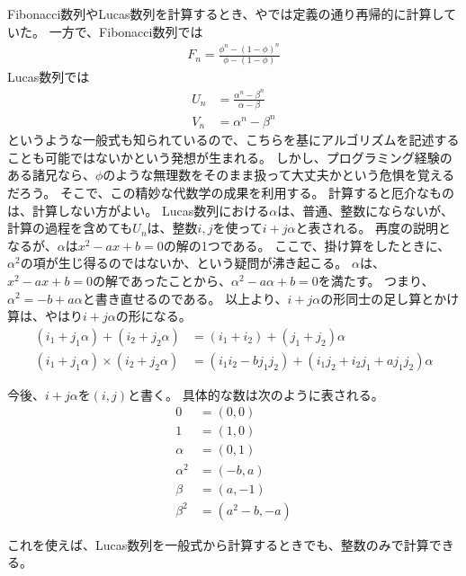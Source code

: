 Fibonacci数列やLucas数列を計算するとき、やでは定義の通り再帰的に計算していた。
一方で、Fibonacci数列では
\begin{align*}
F_n = \frac{\phi^n - (1 - \phi)^n}{\phi - (1 - \phi)}
\end{align*}
Lucas数列では
\begin{align*}
U_n &= \frac{\alpha^n - \beta^n}{\alpha - \beta}\\
V_n &= \alpha^n - \beta^n
\end{align*}
というような一般式も知られているので、こちらを基にアルゴリズムを記述することも可能ではないかという発想が生まれる。
しかし、プログラミング経験のある諸兄なら、$\phi$のような無理数をそのまま扱って大丈夫かという危惧を覚えるだろう。
そこで、この精妙な代数学の成果を利用する。
計算すると厄介なものは、計算しない方がよい。
Lucas数列における$\alpha$は、普通、整数にならないが、計算の過程を含めても$U_n$は、整数$i,j$を使って$i + j\alpha$と表される。
再度の説明となるが、$\alpha$は$x^2-ax+b=0$の解の1つである。
ここで、掛け算をしたときに、$\alpha^2$の項が生じ得るのではないか、という疑問が沸き起こる。
$\alpha$は、$x^2-ax+b=0$の解であったことから、$\alpha^2-a\alpha+b=0$を満たす。
つまり、$\alpha^2=-b+a\alpha$と書き直せるのである。
以上より、$i+j\alpha$の形同士の足し算とかけ算は、やはり$i+j\alpha$の形になる。
\begin{align*}
(i_1 + j_1\alpha) + (i_2 + j_2\alpha) &= (i_1 + i_2) + (j_1 + j_2)\alpha\\
(i_1 + j_1\alpha) \times (i_2 + j_2\alpha) &= (i_1i_2 - bj_1j_2) + (i_1j_2 + i_2j_1 + aj_1j_2)\alpha
\end{align*}

今後、$i + j\alpha$を$(i,j)$と書く。
具体的な数は次のように表される。
\begin{align*}
0 &= (0, 0)\\
1 &= (1, 0)\\
\alpha &= (0, 1)\\
\alpha^2 &= (-b, a)\\
\beta &= (a, -1)\\
\beta^2 &= (a^2-b, -a)
\end{align*}

これを使えば、Lucas数列を一般式から計算するときでも、整数のみで計算できる。
